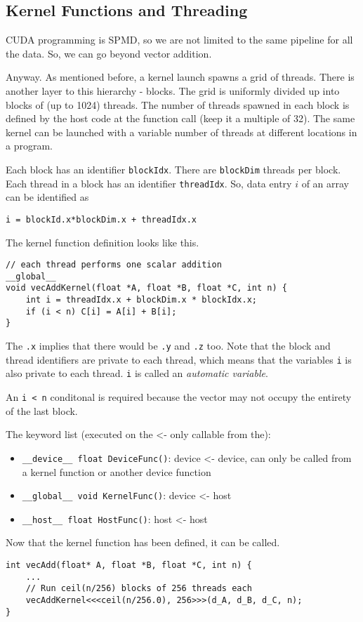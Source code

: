 \subsection*{Kernel Functions and Threading}
CUDA programming is SPMD, so we are not limited to the same pipeline
for all the data. So, we can go beyond vector addition.

Anyway. As mentioned before, a kernel launch spawns a grid of threads.
There is another layer to this hierarchy - blocks. The grid is uniformly
divided up into blocks of (up to 1024) threads. The number of
threads spawned in each block is defined by the host code at the
function call (keep it a multiple of 32). The same kernel can be
launched with a variable
number of threads at different locations in a program.

Each block has an identifier \texttt{blockIdx}. There are
\texttt{blockDim} threads per block. Each thread in a block has
an identifier \texttt{threadIdx}. So, data entry $i$ of an array
can be identified as
\begin{verbatim}
i = blockId.x*blockDim.x + threadIdx.x 
\end{verbatim}

The kernel function definition looks like this.
\begin{verbatim}
// each thread performs one scalar addition
__global__
void vecAddKernel(float *A, float *B, float *C, int n) {
    int i = threadIdx.x + blockDim.x * blockIdx.x;
    if (i < n) C[i] = A[i] + B[i];
}
\end{verbatim}
The \texttt{.x} implies that there would be \texttt{.y} and 
\texttt{.z} too. Note that the block and thread identifiers are
private to each thread, which means that the variables \texttt{i}
is also private to each thread. \texttt{i} is called an \textit{
    automatic variable}.

An \texttt{i < n} conditonal is required because the vector may not
occupy the entirety of the last block.

The keyword list (executed on the <- only callable from the):
\begin{itemize}
    \item \texttt{\_\_device\_\_ float DeviceFunc()}: device <- device, can only be called from a kernel function or another device function
    \item \texttt{\_\_global\_\_ void KernelFunc()}: device <- host
    \item \texttt{\_\_host\_\_ float HostFunc()}: host <- host
\end{itemize}

Now that the kernel function has been defined, it can be called.
\begin{verbatim}
int vecAdd(float* A, float *B, float *C, int n) {
    ...
    // Run ceil(n/256) blocks of 256 threads each
    vecAddKernel<<<ceil(n/256.0), 256>>>(d_A, d_B, d_C, n);
}
\end{verbatim}
